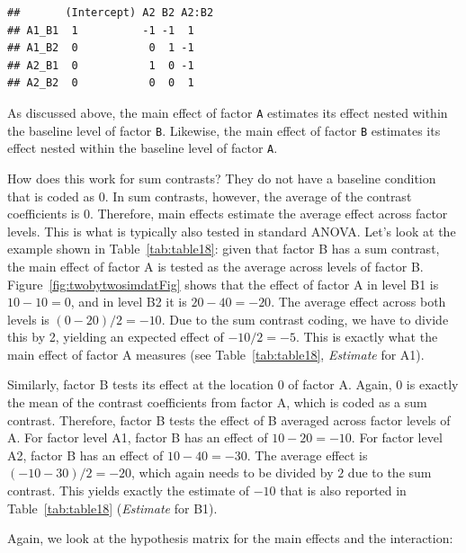 \documentclass[12pt,]{krantz}
\theoremstyle{definition}
\theoremstyle{definition}
\theoremstyle{definition}
\theoremstyle{remark}
\begin{document}
\begin{verbatim}
##       (Intercept) A2 B2 A2:B2
## A1_B1  1          -1 -1  1   
## A1_B2  0           0  1 -1   
## A2_B1  0           1  0 -1   
## A2_B2  0           0  0  1
\end{verbatim}

As discussed above, the main effect of factor \texttt{A} estimates its effect nested within the baseline level of factor \texttt{B}. Likewise, the main effect of factor \texttt{B} estimates its effect nested within the baseline level of factor \texttt{A}.

How does this work for sum contrasts? They do not have a baseline condition that is coded as \(0\). In sum contrasts, however, the average of the contrast coefficients is \(0\). Therefore, main effects estimate the average effect across factor levels. This is what is typically also tested in standard ANOVA. Let's look at the example shown in Table~\ref{tab:table18}: given that factor B has a sum contrast, the main effect of factor A is tested as the average across levels of factor B. Figure~\ref{fig:twobytwosimdatFig} shows that the effect of factor A in level B1 is \(10 - 10 = 0\), and in level B2 it is \(20 - 40 = -20\). The average effect across both levels is \((0 - 20)/2 = -10\). Due to the sum contrast coding, we have to divide this by 2, yielding an expected effect of \(-10 / 2 = -5\). This is exactly what the main effect of factor A measures (see Table~\ref{tab:table18}, \emph{Estimate} for A1).

Similarly, factor B tests its effect at the location \(0\) of factor A. Again, \(0\) is exactly the mean of the contrast coefficients from factor A, which is coded as a sum contrast. Therefore, factor B tests the effect of B averaged across factor levels of A. For factor level A1, factor B has an effect of \(10 - 20 = -10\). For factor level A2, factor B has an effect of \(10 - 40 = -30\). The average effect is \((-10 - 30)/2 = -20\), which again needs to be divided by \(2\) due to the sum contrast. This yields exactly the estimate of \(-10\) that is also reported in Table~\ref{tab:table18} (\emph{Estimate} for B1).

Again, we look at the hypothesis matrix for the main effects and the interaction:
\end{document}
